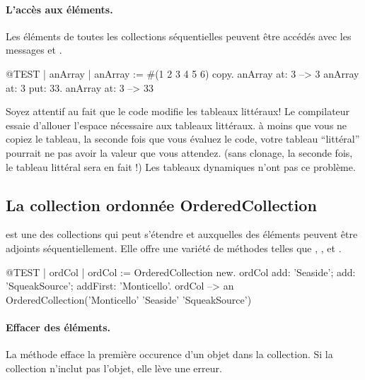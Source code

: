 \documentclass[a4paper,10pt,twoside]{book}
\begin{document}
\paragraph{L'accès aux éléments.}
Les éléments de toutes les collections séquentielles peuvent
être accédés avec les messages  et
 .

\begin{code}{@TEST | anArray |}
anArray := #(1 2 3 4 5 6) copy.
anArray at: 3 --> 3
anArray at: 3 put: 33.
anArray at: 3 --> 33
\end{code}

\noindent
Soyez attentif au fait que le code modifie les tableaux littéraux!
Le compilateur essaie d'allouer l'espace nécessaire aux tableaux littéraux.
à moins que vous ne copiez le tableau, la seconde fois que vous évaluez
le code, votre tableau ``littéral'' pourrait ne pas avoir la valeur que vous
attendez.
(sans clonage, la seconde fois, le tableau littéral  sera en fait !)
Les tableaux dynamiques n'ont pas ce problème.

\subsection{La collection ordonnée OrderedCollection}
 est une des collections qui peut s'étendre
et auxquelles des éléments peuvent être adjoints séquentiellement.
Elle offre une variété de méthodes telles que , ,  et .

\begin{code}{@TEST | ordCol |}
ordCol := OrderedCollection new.
ordCol add: 'Seaside'; add: 'SqueakSource'; addFirst: 'Monticello'.
ordCol --> an OrderedCollection('Monticello' 'Seaside' 'SqueakSource')
\end{code}

\paragraph{Effacer des éléments.} La méthode   efface la première occurence d'un objet dans la collection. Si la collection n'inclut pas l'objet, elle lève une erreur.
\end{document}
